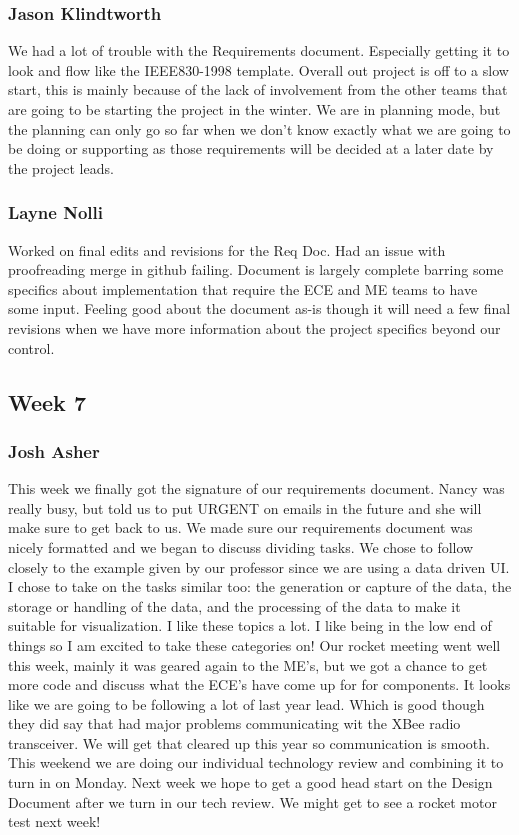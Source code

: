 \documentclass[10pt,draftclsnofoot,onecolumn]{IEEEtran}
\begin{document}
\subsubsection{Jason Klindtworth} We had a lot of trouble with the Requirements document. Especially getting it to look and flow like the IEEE830-1998 template. Overall out project is off to a slow start, this is mainly because of the lack of involvement from the other teams that are going to be starting the project in the winter. We are in planning mode, but the planning can only go so far when we don't know exactly what we are going to be doing or supporting as those requirements will be decided at a later date by the project leads.\par

\subsubsection{Layne Nolli} Worked on final edits and revisions for the Req Doc. Had an issue with proofreading merge in github failing. Document is largely complete barring some specifics about implementation that require the ECE and ME teams to have some input. Feeling good about the document as-is though it will need a few final revisions when we have more information about the project specifics beyond our control. \par

\subsection{Week 7}
\subsubsection{Josh Asher} This week we finally got the signature of our requirements document. Nancy was really busy, but told us to put URGENT on emails in the future and she will make sure to get back to us. We made sure our requirements document was nicely formatted and we began to discuss dividing tasks. We chose to follow closely to the example given by our professor since we are using a data driven UI. I chose to take on the tasks similar too: the generation or capture of the data, the storage or handling of the data, and the processing of the data to make it suitable for visualization. I like these topics a lot. I like being in the low end of things so I am excited to take these categories on! Our rocket meeting went well this week, mainly it was geared again to the ME's, but we got a chance to get more code and discuss what the ECE's have come up for for components. It looks like we are going to be following a lot of last year lead. Which is good though they did say that had major problems communicating wit the XBee radio transceiver. We will get that cleared up this year so communication is smooth. This weekend we are doing our individual technology review and combining it to turn in on Monday. Next week we hope to get a good head start on the Design Document after we turn in our tech review. We might get to see a rocket motor test next week!
\end{document}

